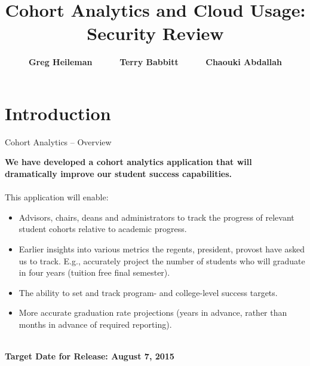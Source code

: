 \documentclass[t]{beamer}   %
\title[Cohort Analytics]
{Cohort Analytics and Cloud Usage: Security Review}
\author[Heileman, Babbitt \& Abdallah] %
{\bf Greg Heileman \ \ \ \ \ Terry Babbitt \ \ \ \ \ Chaouki Abdallah}
\institute[UNM]
{Application Development Team \\
Academic Affairs \\
University of New Mexico}
\date[June 26, 2015]
\begin{document}
\begin{frame}
  \titlepage
\end{frame}



%

\section{Introduction}

\begin{frame}{Cohort Analytics -- Overview}%

\vspace*{-0.2in}
\textbf{We have developed a cohort analytics application that will dramatically improve our student success capabilities.}~\\~\\
\pause
This application will enable:
\begin{itemize}
\item Advisors, chairs, deans and administrators to track the progress of relevant student cohorts relative to academic progress. 
\pause
\item Earlier insights into various metrics the regents, president, provost have asked us to track.  E.g., accurately project the number of students who will graduate in four years (tuition free final semester).
\pause
\item The ability to set and track program- and college-level success targets.
\pause
\item More accurate graduation rate projections (years in advance, rather than months in advance of required reporting). 
\end{itemize}~\\
\pause
{\bf Target Date for Release: August 7, 2015}
\end{frame}
\end{document}
